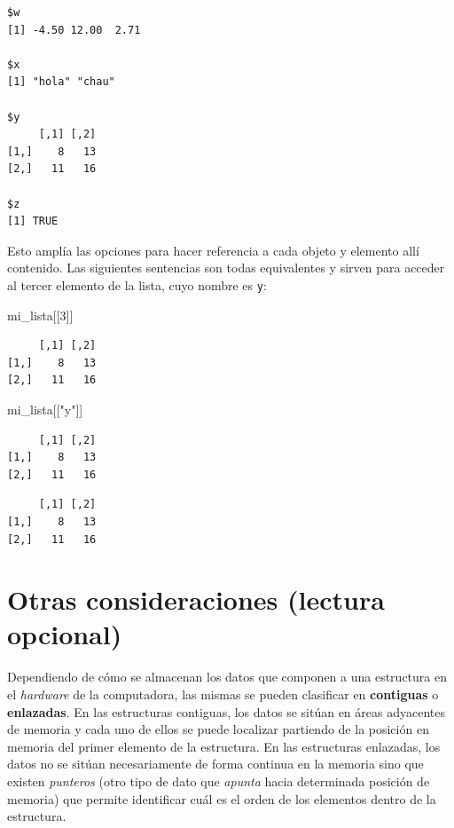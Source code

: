 \documentclass[
]{book}
\newenvironment{Shaded}{\begin{snugshade}}{\end{snugshade}}
\newcommand{\DecValTok}[1]{\textcolor[rgb]{0.00,0.00,0.81}{#1}}
\newcommand{\NormalTok}[1]{#1}
\newcommand{\SpecialCharTok}[1]{\textcolor[rgb]{0.00,0.00,0.00}{#1}}
\newcommand{\StringTok}[1]{\textcolor[rgb]{0.31,0.60,0.02}{#1}}
\begin{document}
\begin{verbatim}
$w
[1] -4.50 12.00  2.71

$x
[1] "hola" "chau"

$y
     [,1] [,2]
[1,]    8   13
[2,]   11   16

$z
[1] TRUE
\end{verbatim}

Esto amplía las opciones para hacer referencia a cada objeto y elemento allí contenido. Las siguientes sentencias son todas equivalentes y sirven para acceder al tercer elemento de la lista, cuyo nombre es \texttt{y}:

\begin{Shaded}
\begin{Highlighting}[]
\NormalTok{mi\_lista[[}\DecValTok{3}\NormalTok{]]}
\end{Highlighting}
\end{Shaded}

\begin{verbatim}
     [,1] [,2]
[1,]    8   13
[2,]   11   16
\end{verbatim}

\begin{Shaded}
\begin{Highlighting}[]
\NormalTok{mi\_lista[[}\StringTok{"y"}\NormalTok{]]}
\end{Highlighting}
\end{Shaded}

\begin{verbatim}
     [,1] [,2]
[1,]    8   13
[2,]   11   16
\end{verbatim}

\begin{Shaded}
\end{Shaded}

\begin{verbatim}
     [,1] [,2]
[1,]    8   13
[2,]   11   16
\end{verbatim}

\hypertarget{otras-consideraciones-lectura-opcional}{%
\section{Otras consideraciones (lectura opcional)}\label{otras-consideraciones-lectura-opcional}}

Dependiendo de cómo se almacenan los datos que componen a una estructura en el \emph{hardware} de la computadora, las mismas se pueden clasificar en \textbf{contiguas} o \textbf{enlazadas}. En las estructuras contiguas, los datos se sitúan en áreas adyacentes de memoria y cada uno de ellos se puede localizar partiendo de la posición en memoria del primer elemento de la estructura. En las estructuras enlazadas, los datos no se sitúan necesariamente de forma continua en la memoria sino que existen \emph{punteros} (otro tipo de dato que \emph{apunta} hacia determinada posición de memoria) que permite identificar cuál es el orden de los elementos dentro de la estructura.
\end{document}
